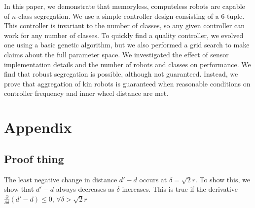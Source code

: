 \documentclass[conference]{IEEEtran}
\begin{document}
  In this paper, we demonstrate that memoryless, computeless robots are capable of $n$-class segregation. We use a simple controller design consisting of a 6-tuple. This controller is invariant to the number of classes, so any given controller can work for any number of classes. To quickly find a quality controller, we evolved one using a basic genetic algorithm, but we also performed a grid search to make claims about the full parameter space. We investigated the effect of sensor implementation details and the number of robots and classes on performance. We find that robust segregation is possible, although not guaranteed. Instead, we prove that aggregation of kin robots is guaranteed when reasonable conditions on controller frequency and inner wheel distance are met.




\onecolumn
\appendix
\section{Appendix}

  \subsection{Proof thing}

    The least negative change in distance $d'-d$ occurs at $\delta=\sqrt{2}r$. To show this, we show that $d'-d$ always decreases as $\delta$ increases. This is true if the derivative $\frac{\partial}{\partial\delta}(d'-d) \leq 0$, $\forall \delta>\sqrt{2}r$
\end{document}
